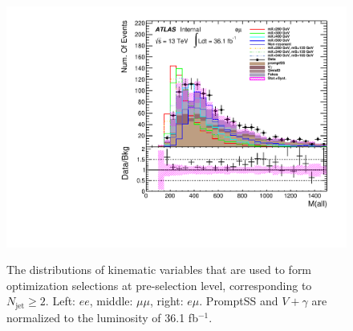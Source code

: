 \begin{figure}[h]
\begin{minipage}[t]{0.33\linewidth}
 \includegraphics[width=1.0\textwidth,angle=-90]{fig/dataMC_low_Njet_CR/m_all_emu.pdf}\label{fig:dataMC_low_Njet_CR:m_all_emu.pdf}
 \end{minipage}
 \caption{The distributions of kinematic variables that are used to form optimization selections at pre-selection level, corresponding to $N_{\text{jet}}\geq2$. Left: $ee$, middle: $\mu\mu$, right: $e\mu$. PromptSS and $V+\gamma$ are normalized to the luminosity of 36.1 fb$^{-1}$.}
\label{fig:SigOpt_low_kine}
\end{figure}

